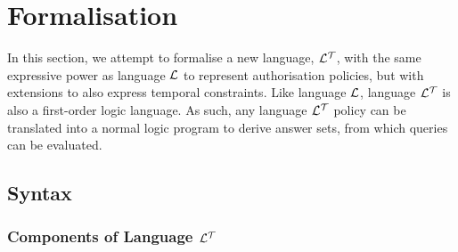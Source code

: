 \documentclass[11pt]{report}
\begin{document}
    \section{Formalisation}

      In this section, we attempt to formalise a new language, ${\cal L^T}$,
      with the same expressive power as language ${\cal L}$ to represent
      authorisation policies, but with extensions to also express temporal
      constraints. Like language ${\cal L}$, language ${\cal L^T}$ is also a
      first-order logic language. As such, any language ${\cal L^T}$ policy
      can be translated into a normal logic program to derive answer sets,
      from which queries can be evaluated.

      \subsection{Syntax}

        \subsubsection{Components of Language ${\cal L^T}$}
\end{document}
